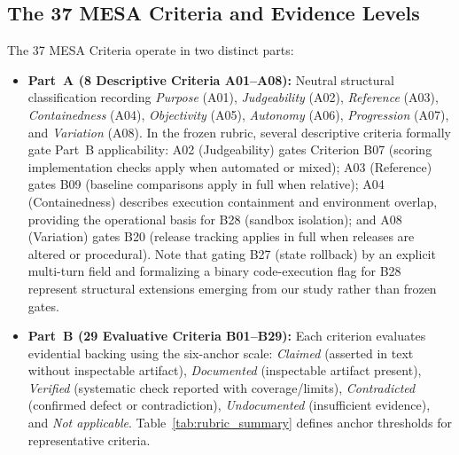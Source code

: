 \documentclass[runningheads]{llncs}
\begin{document}
\subsection{The 37 MESA Criteria and Evidence Levels}
The 37 MESA Criteria operate in two distinct parts:
\begin{itemize}[leftmargin=*]
    \item \textbf{Part~A (8 Descriptive Criteria A01--A08):} Neutral structural classification recording \emph{Purpose} (A01), \emph{Judgeability} (A02), \emph{Reference} (A03), \emph{Containedness} (A04), \emph{Objectivity} (A05), \emph{Autonomy} (A06), \emph{Progression} (A07), and \emph{Variation} (A08). In the frozen rubric, several descriptive criteria formally gate Part~B applicability: A02 (Judgeability) gates Criterion B07 (scoring implementation checks apply when automated or mixed); A03 (Reference) gates B09 (baseline comparisons apply in full when relative); A04 (Containedness) describes execution containment and environment overlap, providing the operational basis for B28 (sandbox isolation); and A08 (Variation) gates B20 (release tracking applies in full when releases are altered or procedural). Note that gating B27 (state rollback) by an explicit multi-turn field and formalizing a binary code-execution flag for B28 represent structural extensions emerging from our study rather than frozen gates.
    \item \textbf{Part~B (29 Evaluative Criteria B01--B29):} Each criterion evaluates evidential backing using the six-anchor scale: \emph{Claimed} (asserted in text without inspectable artifact), \emph{Documented} (inspectable artifact present), \emph{Verified} (systematic check reported with coverage/limits), \emph{Contradicted} (confirmed defect or contradiction), \emph{Undocumented} (insufficient evidence), and \emph{Not applicable}. Table~\ref{tab:rubric_summary} defines anchor thresholds for representative criteria.
\end{itemize}
\end{document}
